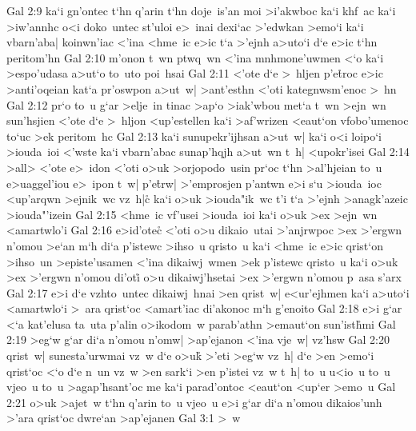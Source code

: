 \vs Gal 2:9
ka`i
gn'ontec
t`hn
q'arin
t`hn
doje~is'an
moi
>i'akwboc
ka`i
khf~ac
ka`i
>iw'annhc
o<i
doko~untec
st'uloi
e>~inai
dexi`ac
>'edwkan
>emo`i
ka`i
vbarn'aba|
koinwn'iac
<'ina
<hme~ic
e>ic
t`a
>'ejnh
a>uto`i
d`e
e>ic
t`hn
peritom'hn\bibvsend
\vs Gal 2:10
m'onon
t~wn
ptwq~wn
<'ina
mnhmone'uwmen
<`o
ka`i
>espo'udasa
a>ut`o
to~uto
poi~hsai\bibvsend
\vs Gal 2:11
<'ote
d`e
>~hljen
p'e\r{t}roc
e>ic
>anti'oqeian
kat`a
pr'oswpon
a>ut~w|
>ant'esthn
<'oti
kategnwsm'enoc
>~hn\bibvsend
\vs Gal 2:12
pr`o
to~u
g`ar
>elje~in
tinac
>ap`o
>iak'wbou
met`a
t~wn
>ejn~wn
sun'hsjien
<'ote
d`e
>~hljon
<up'estellen
ka`i
>af'wrizen
<eaut`on
vfobo'umenoc
to`uc
>ek
peritom~hc\bibvsend
\vs Gal 2:13
ka`i
sunupekr'ijhsan
a>ut~w|
ka`i
o<i
loipo`i
>iouda~ioi
<'wste
ka`i
vbarn'abac
sunap'hqjh
a>ut~wn
t~h|
<upokr'isei\bibvsend
\vs Gal 2:14
>all>
<'ote
e>~idon
<'oti
o>uk
>orjopodo~usin
pr`oc
t`hn
>al'hjeian
to~u
e>uaggel'iou
e>~ipon
t~w|
p'e\r{t}rw|
>'emprosjen
p'antwn
e>i
s`u
>iouda~ioc
<up'arqwn
>ejnik~wc
vz~h|c\r{}
ka`i
o>uk
>iouda"ik~wc
t'i
t`a
>'ejnh
>anagk'azeic
>iouda"'izein\bibvsend
\vs Gal 2:15
<hme~ic
vf'usei
>iouda~ioi
ka`i
o>uk
>ex
>ejn~wn
<amartwlo'i\bibvsend
\vs Gal 2:16
e>id'ote\r{c}
<'oti
o>u
dikaio~utai
>'anjrwpoc
>ex
>'ergwn
n'omou
>e`an
m`h
di`a
p'istewc
>ihso~u
qristo~u
ka`i
<hme~ic
e>ic
qrist`on
>ihso~un
>episte'usamen
<'ina
dikaiwj~wmen
>ek
p'istewc
qristo~u
ka`i
o>uk
>ex
>'ergwn
n'omou
di'oti\r{}
o>u
dikaiwj'hsetai
>ex
>'ergwn
n'omou
p~asa
s'arx\bibvsend
\vs Gal 2:17
e>i
d`e
vzhto~untec
dikaiwj~hnai
>en
qrist~w|
e<ur'ejhmen
ka`i
a>uto`i
<amartwlo`i
>~ara
qrist`oc
<amart'iac
di'akonoc
m`h
g'enoito\bibvsend
\vs Gal 2:18
e>i
g`ar
<`a
kat'elusa
ta~uta
p'alin
o>ikodom~w
parab'athn
>emaut`on
sun'ist\r{h}mi\bibvsend
{}
\vs Gal 2:19
>eg`w
g`ar
di`a
n'omou
n'omw|
>ap'ejanon
<'ina
vje~w|
vz'hsw\bibvsend
\vs Gal 2:20
qrist~w|
sunesta'urwmai
vz~w
d`e
o>uk\r{}
>'eti
>eg`w
vz~h|
d`e
>en
>emo`i
qrist`oc
<`o
d`e
n~un
vz~w
>en
sark`i
>en
p'istei
vz~w
t~h|
to~u
u<io~u
to~u
vjeo~u
to~u
>agap'hsant'oc
me
ka`i
parad'ontoc
<eaut`on
<up`er
>emo~u\bibvsend
\vs Gal 2:21
o>uk
>ajet~w
t`hn
q'arin
to~u
vjeo~u
e>i
g`ar
di`a
n'omou
dikaios'unh
>'ara
qrist`oc
dwre`an
>ap'ejanen\bibvsend
\vs Gal 3:1
>~w
